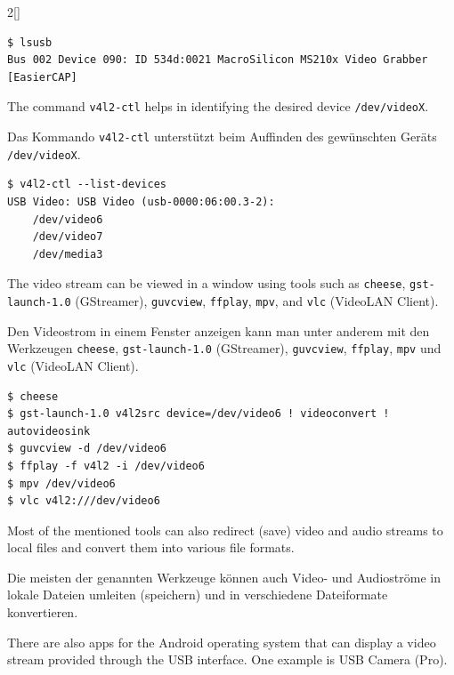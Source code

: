 \begin{paracol}{2}[]
\colende

\begin{lstlisting}[style=shell]
$ lsusb
Bus 002 Device 090: ID 534d:0021 MacroSilicon MS210x Video Grabber [EasierCAP]
\end{lstlisting}
\FloatBarrier

\colstart

The command \verb!v4l2-ctl! helps in identifying the desired device \verb!/dev/videoX!.

\colger

Das Kommando \verb!v4l2-ctl! unterstützt beim Auffinden des gewünschten Geräts \verb!/dev/videoX!.

\colende

\begin{lstlisting}[style=shell]
$ v4l2-ctl --list-devices
USB Video: USB Video (usb-0000:06:00.3-2):
	/dev/video6
	/dev/video7
	/dev/media3
\end{lstlisting}
\FloatBarrier

\colstart

The video stream can be viewed in a window using tools such as \verb!cheese!, \verb!gst-launch-1.0! (GStreamer), \verb!guvcview!, \verb!ffplay!, \verb!mpv!, and \verb!vlc! (VideoLAN Client).

\colger

Den Videostrom in einem Fenster anzeigen kann man unter anderem mit den Werkzeugen \verb!cheese!, \verb!gst-launch-1.0! (GStreamer), \verb!guvcview!, \verb!ffplay!, \verb!mpv! und \verb!vlc! (VideoLAN Client).

\colende

\begin{lstlisting}[style=shell]
$ cheese
$ gst-launch-1.0 v4l2src device=/dev/video6 ! videoconvert ! autovideosink
$ guvcview -d /dev/video6
$ ffplay -f v4l2 -i /dev/video6
$ mpv /dev/video6
$ vlc v4l2:///dev/video6
\end{lstlisting}
\FloatBarrier

\colstart

Most of the mentioned tools can also redirect (save) video and audio streams to local files and convert them into various file formats.

\colger

Die meisten der genannten Werkzeuge können auch Video- und Audioströme in lokale Dateien umleiten (speichern) und in verschiedene Dateiformate konvertieren.

\coleng

There are also apps for the Android operating system that can display a video stream provided through the USB interface. One example is USB Camera (Pro).


\end{paracol}

